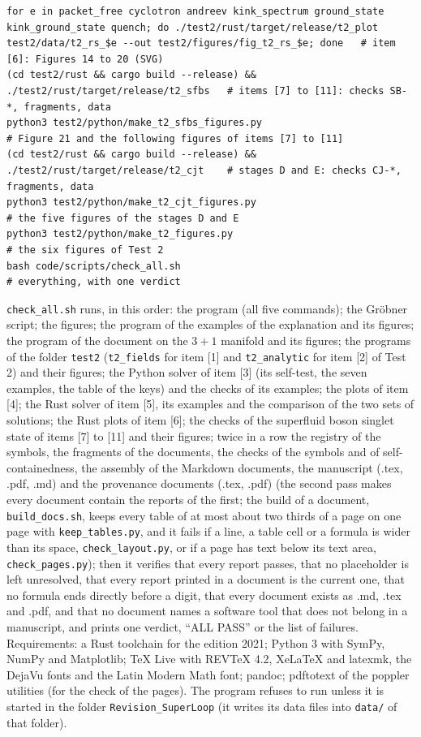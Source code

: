 \documentclass[
  10pt,
]{article}
\begin{document}
\begin{verbatim}
for e in packet_free cyclotron andreev kink_spectrum ground_state kink_ground_state quench; do ./test2/rust/target/release/t2_plot test2/data/t2_rs_$e --out test2/figures/fig_t2_rs_$e; done   # item [6]: Figures 14 to 20 (SVG)
(cd test2/rust && cargo build --release) && ./test2/rust/target/release/t2_sfbs   # items [7] to [11]: checks SB-*, fragments, data
python3 test2/python/make_t2_sfbs_figures.py                             # Figure 21 and the following figures of items [7] to [11]
(cd test2/rust && cargo build --release) && ./test2/rust/target/release/t2_cjt    # stages D and E: checks CJ-*, fragments, data
python3 test2/python/make_t2_cjt_figures.py                              # the five figures of the stages D and E
python3 test2/python/make_t2_figures.py                                  # the six figures of Test 2
bash code/scripts/check_all.sh                                           # everything, with one verdict
\end{verbatim}

\texttt{check\_all.sh} runs, in this order: the program (all five
commands); the Gröbner script; the figures; the program of the examples
of the explanation and its figures; the program of the document on the
\(3+1\) manifold and its figures; the programs of the folder
\texttt{test2} (\texttt{t2\_fields} for item {[}1{]} and
\texttt{t2\_analytic} for item {[}2{]} of Test 2) and their figures; the
Python solver of item {[}3{]} (its self-test, the seven examples, the
table of the keys) and the checks of its examples; the plots of item
{[}4{]}; the Rust solver of item {[}5{]}, its examples and the
comparison of the two sets of solutions; the Rust plots of item {[}6{]};
the checks of the superfluid boson singlet state of items {[}7{]} to
{[}11{]} and their figures; twice in a row the registry of the symbols,
the fragments of the documents, the checks of the symbols and of
self-containedness, the assembly of the Markdown documents, the
manuscript (.tex, .pdf, .md) and the provenance documents (.tex, .pdf)
(the second pass makes every document contain the reports of the first;
the build of a document, \texttt{build\_docs.sh}, keeps every table of
at most about two thirds of a page on one page with
\texttt{keep\_tables.py}, and it fails if a line, a table cell or a
formula is wider than its space, \texttt{check\_layout.py}, or if a page
has text below its text area, \texttt{check\_pages.py}); then it
verifies that every report passes, that no placeholder is left
unresolved, that every report printed in a document is the current one,
that no formula ends directly before a digit, that every document exists
as .md, .tex and .pdf, and that no document names a software tool that
does not belong in a manuscript, and prints one verdict, ``ALL PASS'' or
the list of failures. Requirements: a Rust toolchain for the edition
2021; Python 3 with SymPy, NumPy and Matplotlib; TeX Live with REVTeX
4.2, XeLaTeX and latexmk, the DejaVu fonts and the Latin Modern Math
font; pandoc; pdftotext of the poppler utilities (for the check of the
pages). The program refuses to run unless it is started in the folder
\texttt{Revision\_SuperLoop} (it writes its data files into
\texttt{data/} of that folder).
\end{document}
